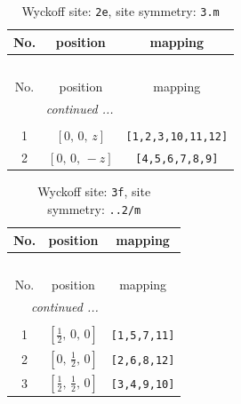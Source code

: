 \documentclass[fleqn,8pt]{jsarticle}
\begin{document}
\begin{longtable}{ccc}
\caption{Wyckoff site: {\tt 2e}, site symmetry: {\tt 3.m}}
 \\
 \hline \hline
No. & position & mapping \\ \hline \endfirsthead

\multicolumn{2}{l}{\tablename\ \thetable{}} \\
 \hline \hline
No. & position & mapping \\ \hline \endhead

 \hline \hline
\multicolumn{2}{r}{\footnotesize\it continued ...} \\ \endfoot

 \hline \hline
\multicolumn{2}{r}{} \\ \endlastfoot

1 & $\left[ 0,\, 0,\, z \right]$ & {\tt [1,2,3,10,11,12]} \\ \hline
2 & $\left[ 0,\, 0,\, - z \right]$ & {\tt [4,5,6,7,8,9]} \\
\end{longtable}
\renewcommand{\arraystretch}{1.2}
\begin{longtable}{ccc}
\caption{Wyckoff site: {\tt 3f}, site symmetry: {\tt ..2/m}}
 \\
 \hline \hline
No. & position & mapping \\ \hline \endfirsthead

\multicolumn{2}{l}{\tablename\ \thetable{}} \\
 \hline \hline
No. & position & mapping \\ \hline \endhead

 \hline \hline
\multicolumn{2}{r}{\footnotesize\it continued ...} \\ \endfoot

 \hline \hline
\multicolumn{2}{r}{} \\ \endlastfoot

1 & $\left[ \frac{1}{2},\, 0,\, 0 \right]$ & {\tt [1,5,7,11]} \\ \hline
2 & $\left[ 0,\, \frac{1}{2},\, 0 \right]$ & {\tt [2,6,8,12]} \\ \hline
3 & $\left[ \frac{1}{2},\, \frac{1}{2},\, 0 \right]$ & {\tt [3,4,9,10]} \\
\end{longtable}
\renewcommand{\arraystretch}{1.2}
\end{document}
